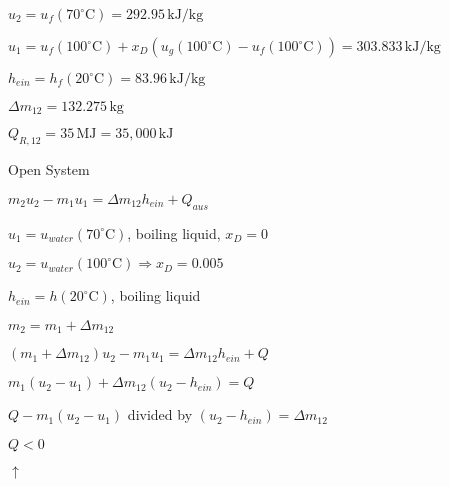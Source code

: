 \( u_2 = u_f(70^\circ \text{C}) = 292.95 \, \text{kJ/kg} \)  

\( u_1 = u_f(100^\circ \text{C}) + x_D \left( u_g(100^\circ \text{C}) - u_f(100^\circ \text{C}) \right) = 303.833 \, \text{kJ/kg} \)  

\( h_{ein} = h_f(20^\circ \text{C}) = 83.96 \, \text{kJ/kg} \)  

\( \Delta m_{12} = 132.275 \, \text{kg} \)

\( Q_{R,12} = 35 \, \text{MJ} = 35,000 \, \text{kJ} \)  

Open System  

\( m_2 u_2 - m_1 u_1 = \Delta m_{12} h_{ein} + Q_{aus} \)  

\( u_1 = u_{water}(70^\circ \text{C}) \), boiling liquid, \( x_D = 0 \)  

\( u_2 = u_{water}(100^\circ \text{C}) \Rightarrow x_D = 0.005 \)  

\( h_{ein} = h(20^\circ \text{C}) \), boiling liquid  

\( m_2 = m_1 + \Delta m_{12} \)  

\( (m_1 + \Delta m_{12}) u_2 - m_1 u_1 = \Delta m_{12} h_{ein} + Q \)  

\( m_1 (u_2 - u_1) + \Delta m_{12} (u_2 - h_{ein}) = Q \)  

\( Q - m_1 (u_2 - u_1) \) divided by \( (u_2 - h_{ein}) = \Delta m_{12} \)  

\( Q < 0 \)  

\( \uparrow \)